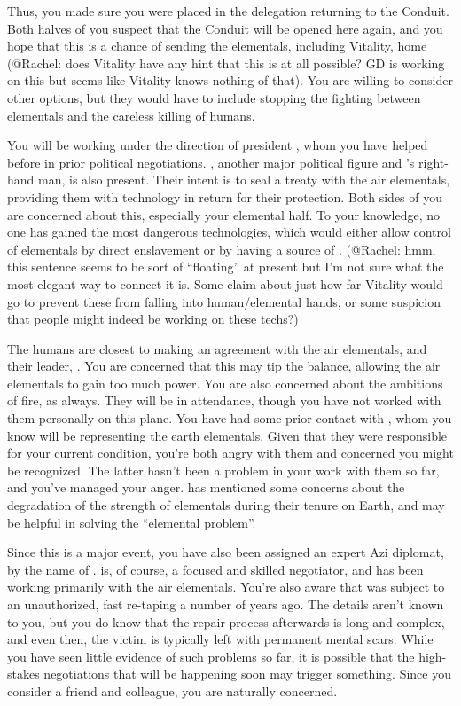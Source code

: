 \documentclass[char]{elementals}
\begin{document}
Thus, you made sure you were placed in the delegation returning to the Conduit.  Both halves of you suspect that the Conduit will be opened here again, and you hope that this is a chance of sending the elementals, including Vitality, home (@Rachel: does Vitality have any hint that this is at all possible? GD is working on this but seems like Vitality knows nothing of that).  You are willing to consider other options, but they would have to include stopping the fighting between elementals and the careless killing of humans.

You will be working under the direction of president \cLeader{\intro}, whom you have helped before in prior political negotiations.  \cDema{\intro}, another major political figure and \cLeader{}'s right-hand man, is also present.  Their intent is to seal a treaty with the air elementals, providing them with technology in return for their protection.  Both sides of you are concerned about this, especially your elemental half.  To your knowledge, no one has gained the most dangerous technologies, which would either allow control of elementals by direct enslavement or by having a source of \iWhiteQ{\MYname{}}. (@Rachel: hmm, this sentence seems to be sort of ``floating'' at present but I'm not sure what the most elegant way to connect it is. Some claim about just how far Vitality would go to prevent these from falling into human/elemental hands, or some suspicion that people might indeed be working on these techs?)

The humans are closest to making an agreement with the air elementals, and their leader, \cKing{}.  You are concerned that this may tip the balance, allowing the air elementals to gain too much power.  You are also concerned about the ambitions of fire, as always.  They will be in attendance, though you have not worked with them personally on this plane.  You have had some prior contact with \cLoyal{}, whom you know will be representing the earth elementals.  Given that they were responsible for your current condition, you're both angry with them and concerned you might be recognized.  The latter hasn't been a problem in your work with them so far, and you've managed your anger.  \cLoyal{} has mentioned some concerns about the degradation of the strength of elementals during their tenure on Earth, and may be helpful in solving the ``elemental problem''.

Since this is a major event, you have also been assigned an expert Azi diplomat, by the name of \cDiplomat{}.  \cDiplomat{\They} is, of course, a focused and skilled negotiator, and has been working primarily with the air elementals.  You're also aware that \cDiplomat{\they} was subject to an unauthorized, fast re-taping a number of years ago.  The details aren't known to you, but you do know that the repair process afterwards is long and complex, and even then, the victim is typically left with permanent mental scars.  While you have seen little evidence of such problems so far, it is possible that the high-stakes negotiations that will be happening soon may trigger something.  Since you consider \cDiplomat{} a friend and colleague, you are naturally concerned.
\end{document}
